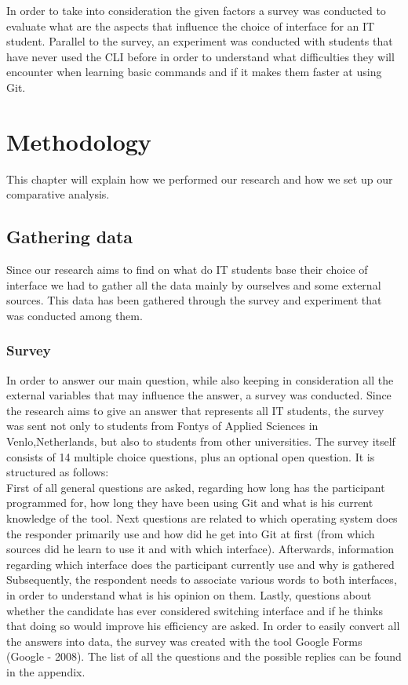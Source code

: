 \documentclass[]{report}
\begin{document}
	In order to take into consideration the given factors a survey was conducted to evaluate what are the aspects that influence the choice of interface for an IT student. Parallel to the survey, an experiment was conducted with students that have never used the CLI before in order to understand what difficulties they will encounter when learning basic commands and if it makes them faster at using Git. 
	
	\section{Methodology}
	This chapter will explain how we performed our research and how we set up our comparative analysis.
	
	\subsection{Gathering data}
	Since our research aims to find  on what do IT students base their choice of interface we had to gather all the data mainly by ourselves and some external sources.  This data has been gathered through the survey and experiment that was conducted among them.
	\subsubsection{Survey}
	
	In order to answer our main question, while also keeping in consideration all the external variables that may influence the answer, a survey was conducted.
	Since the research aims to give an answer that represents all IT students, the survey was sent not only to  students from Fontys of Applied Sciences in Venlo,Netherlands, but also to students from other universities.
	The survey itself consists of 14 multiple choice questions, plus an optional open question. It is structured as follows:\\
	First of all general questions are asked, regarding how long has the participant programmed for, how long they have been using Git and what is his current knowledge of the tool.
	Next questions are related to which operating system does the responder primarily use and how did he get into Git at first (from which sources did he learn to use it and with which interface).
	Afterwards, information regarding which interface does the participant currently use and why is gathered
	Subsequently, the respondent needs to associate various words to both interfaces, in order to understand what is his opinion on them.
	Lastly, questions about whether the candidate has ever considered switching interface and if he thinks that doing so would improve his efficiency are asked.
	In order to easily convert all the answers into data, the survey was created with the tool Google Forms (Google - 2008).
	The list of all the questions and the possible replies can be found in the appendix.
	
\end{document}
